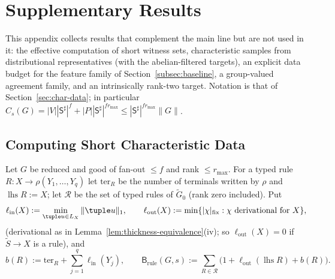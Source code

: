 

\section{Supplementary Results}
\label{app:supplementary}

This appendix collects results that complement the main line but are not
used in it: the effective computation of short witness sets, characteristic
samples from distributional representatives (with the abelian-filtered
targets), an explicit data budget for the feature family of
Section~\ref{subsec:baseline}, a group-valued agreement family, and an
intrinsically rank-two target.  Notation is that of
Section~\ref{sec:char-data}; in particular
$C_s(G)=|V||\mathsf S^\sharp|^f+|P||\mathsf S^\sharp|^{fr_{\max}}\le
|\mathsf S^\sharp|^{fr_{\max}}\|G\|$.

\subsection{Computing Short Characteristic Data}
\label{subsec:effective-char-data}

Let $G$ be reduced and good of fan-out $\le f$ and rank $\le r_{\max}$.  For a
typed rule $R:X\to\rho(Y_1,\ldots,Y_q)$ let $\mathrm{ter}_R$ be the number of terminals
written by $\rho$ and $\operatorname{lhs}R:=X$; let $\mathcal R$ be the set of
typed rules of $\widetilde G_0$ (rank zero included).  Put
\[
 \ell_{\mathrm{in}}(X):=\min_{\tuple u\in L_X}\|\tuple u\|_1,\qquad
 \ell_{\mathrm{out}}(X):=\min\{|\chi|_{\mathrm{fix}}:\chi\text{ derivational for }X\},
\]
(derivational as in Lemma~\ref{lem:thickness-equivalence}(iv); so
$\ell_{\mathrm{out}}(X)=0$ if $\widetilde S\to X$ is a rule), and
\[
 b(R):=\mathrm{ter}_R+\sum_{j=1}^q\ell_{\mathrm{in}}(Y_j),\qquad
 \mathsf B_{\mathrm{rule}}(G,s):=
 \sum_{R\in\mathcal R}\bigl(1+\ell_{\mathrm{out}}(\operatorname{lhs}R)+b(R)\bigr).
\]

